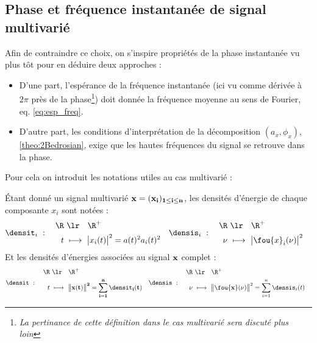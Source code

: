 \subsection{Phase et fréquence instantanée de signal multivarié }\label{subsec:param_instant_nvar}

Afin de contraindre ce choix, on s'inspire propriétés de la phase instantanée vu plus tôt pour en déduire deux approches :
\begin{itemize}
	\item D'une part, l'espérance de la fréquence instantanée (ici vu comme dérivée à $2\pi$ près de la phase\footnote{\itshape
		La pertinance de cette définition dans le cas multivarié sera discuté plus loin})
	doit donnée la fréquence moyenne au sens de Fourier, eq. \eqref{eq:esp_freq}.
	
	\item D'autre part, les conditions d'interprétation de la décomposition $(a_x,\phi_x)$, \cref{theo:2Bedrosian}, exige que les hautes fréquences du signal se retrouve dans la phase.
\end{itemize}

Pour cela on introduit les notations utiles au cas multivarié :
\begin{definition}\label{def:densi_dE-mv}
Étant donné un signal multivarié $\bf{x}=(x_i)_{1\leq i\leq n}$, les densités d'énergie de chaque composante $x_i$  sont notées :
\begin{align}\label{eq:densi_dEi}
	\densit_i\ &:\quad \begin{aligned}\R\ &\lr\quad \R^+ \\ t\ &\longmapsto\ \big|x_i(t)\big|^2 = a(t)^2 a_i(t)^2 \end{aligned}  
	&
	\densis_i\ &:\quad \begin{aligned}\R\ &\lr\quad \R^+ \\ \nu\ &\longmapsto\ \big|\fou{x}_i(\nu)\big|^2 \end{aligned}
\end{align}
Et les densités d'énergies associées au signal $\bf{x}$ complet :
\begin{align}\label{eq:densi_dE-mv}
	\densit\ &:\quad \begin{aligned}\R\ &\lr\quad \R^+ \\ t\ &\longmapsto\ \big\|\bf{x}(t)\big\|^2 = \sum_{i=1}^n \densit_i(t) \end{aligned}  
	&
	\densis\ &:\quad \begin{aligned}\R\ &\lr\quad \R^+ \\ \nu\ &\longmapsto\ \big\|\fou{\bf{x}}(\nu)\big\|^2 = \sum_{i=1}^n \densis_i(t) \end{aligned}	
\end{align}
\end{definition}

